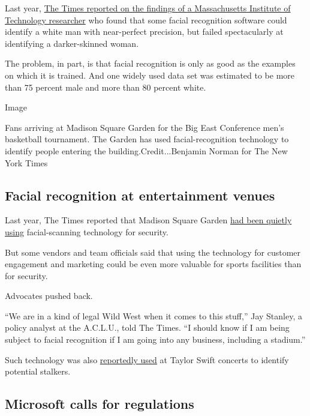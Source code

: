 Last year,
\href{https://www.nytimes3xbfgragh.onion/2018/02/09/technology/facial-recognition-race-artificial-intelligence.html}{The
Times reported on the findings of a Massachusetts Institute of
Technology researcher} who found that some facial recognition software
could identify a white man with near-perfect precision, but failed
spectacularly at identifying a darker-skinned woman.

The problem, in part, is that facial recognition is only as good as the
examples on which it is trained. And one widely used data set was
estimated to be more than 75 percent male and more than 80 percent
white.

Image

Fans arriving at Madison Square Garden for the Big East Conference men's
basketball tournament. The Garden has used facial-recognition technology
to identify people entering the building.Credit...Benjamin Norman for
The New York Times

\hypertarget{facial-recognition-at-entertainment-venues}{%
\subsection{Facial recognition at entertainment
venues}\label{facial-recognition-at-entertainment-venues}}

Last year, The Times reported that Madison Square Garden
\href{https://www.nytimes3xbfgragh.onion/2018/03/13/sports/facial-recognition-madison-square-garden.html?module=inline}{had
been quietly using} facial-scanning technology for security.

But some vendors and team officials said that using the technology for
customer engagement and marketing could be even more valuable for sports
facilities than for security.

Advocates pushed back.

``We are in a kind of legal Wild West when it comes to this stuff,'' Jay
Stanley, a policy analyst at the A.C.L.U., told The Times. ``I should
know if I am being subject to facial recognition if I am going into any
business, including a stadium.''

Such technology was also
\href{https://www.nytimes3xbfgragh.onion/2018/12/13/arts/music/taylor-swift-facial-recognition.html}{reportedly
used} at Taylor Swift concerts to identify potential stalkers.

\hypertarget{microsoft-calls-for-regulations}{%
\subsection{Microsoft calls for
regulations}\label{microsoft-calls-for-regulations}}

